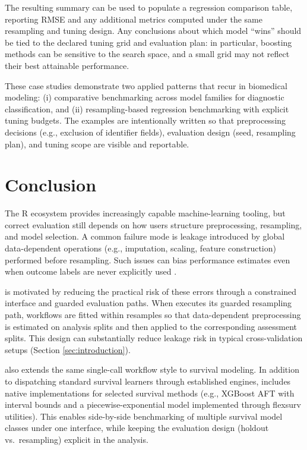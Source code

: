 The resulting summary can be used to populate a regression comparison table, reporting RMSE and any additional metrics computed under the same resampling and tuning design. Any conclusions about which model ``wins'' should be tied to the declared tuning grid and evaluation plan: in particular, boosting methods can be sensitive to the search space, and a small grid may not reflect their best attainable performance.

These case studies demonstrate two applied patterns that recur in biomedical modeling: (i) comparative benchmarking across model families for diagnostic classification, and (ii) resampling-based regression benchmarking with explicit tuning budgets. The examples are intentionally written so that preprocessing decisions (e.g., exclusion of identifier fields), evaluation design (seed, resampling plan), and tuning scope are visible and reportable.

\section{Conclusion}\label{conclusion}

The R ecosystem provides increasingly capable machine-learning tooling, but correct evaluation still depends on how users structure preprocessing, resampling, and model selection. A common failure mode is leakage introduced by global data-dependent operations (e.g., imputation, scaling, feature construction) performed before resampling. Such issues can bias performance estimates even when outcome labels are never explicitly used \citep{Kapoor:2023aa}.

 is motivated by reducing the practical risk of these errors through a constrained interface and guarded evaluation paths. When  executes its guarded resampling path, workflows are fitted within resamples so that data-dependent preprocessing is estimated on analysis splits and then applied to the corresponding assessment splits. This design can substantially reduce leakage risk in typical cross-validation setups (Section \ref{sec:introduction}).

 also extends the same single-call workflow style to survival modeling. In addition to dispatching standard survival learners through established engines,  includes native implementations for selected survival methods (e.g., XGBoost AFT with interval bounds and a piecewise-exponential model implemented through flexsurv utilities). This enables side-by-side benchmarking of multiple survival model classes under one interface, while keeping the evaluation design (holdout vs.~resampling) explicit in the analysis.

